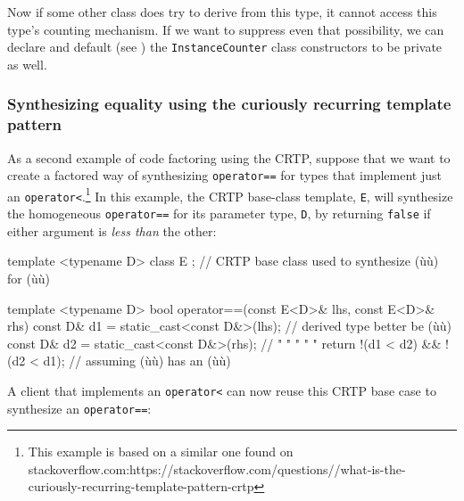 \noindent Now if some other class does try to derive from this type, it cannot
access this type's counting mechanism. If we want to suppress even that
possibility, we can declare and default (see )
the \lstinline!InstanceCounter!
class constructors to be private as well.

\subsubsection[Synthesizing equality using the curiously recurring template pattern]{Synthesizing equality using the curiously recurring template pattern}\label{synthesizing-equality-using-crtp}

As a second example of code factoring using the CRTP, suppose that we want
to create a factored way of synthesizing \lstinline!operator==! for types
that implement just an \lstinline!operator<!.{\cprotect\footnote{This
example is based on a similar one found on stackoverflow.com:\linebreak[3]
  https://\linebreak[3]stackoverflow.\linebreak[3]com/\linebreak[3]questions//what-is-the-curiously-recurring-template-pattern-crtp}}
In this example, the CRTP base-class template, \lstinline!E!, will
synthesize the homogeneous \lstinline!operator==! for its parameter type,
\lstinline!D!, by returning \lstinline!false! if either argument is \emph{less
than} the other:

\begin{emcppslisting}[emcppsbatch=e5]
template <typename D>
class E { }; // CRTP base class used to synthesize (ù{}ù) for (ù{}ù)

template <typename D>
bool operator==(const E<D>& lhs, const E<D>& rhs)
{
    const D& d1 = static_cast<const D&>(lhs);  // derived type better be (ù{}ù)
    const D& d2 = static_cast<const D&>(rhs);  //    "     "     "    "  "
    return !(d1 < d2) && !(d2 < d1);           // assuming (ù{}ù) has an (ù{}ù)
}
\end{emcppslisting}

\noindent A client that implements an \lstinline!operator<! can now reuse this CRTP
base case to synthesize an \lstinline!operator==!:

